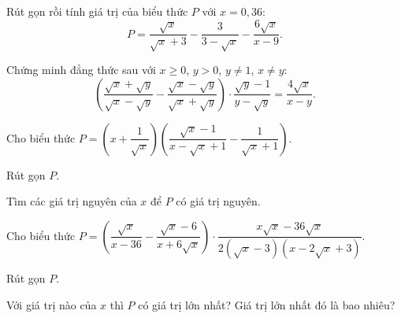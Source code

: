 \begin{bt}%
	Rút gọn rồi tính giá trị của biểu thức $P$ với $x=0{,}36$: 
	$$P =\dfrac{\sqrt{x}}{\sqrt{x} + 3} - \dfrac{3}{3 - \sqrt{x}} - \dfrac{6\sqrt{x}}{x - 9}.$$
\end{bt}
\begin{bt}%
	Chứng minh đẳng thức sau với $x\geq 0$, $y>0$, $y\neq 1$, $x\neq y$:
	$$\left(\dfrac{\sqrt{x} + \sqrt{y}}{\sqrt{x} - \sqrt{y}} - \dfrac{\sqrt{x} - \sqrt{y}}{\sqrt{x} + \sqrt{y}}\right)\cdot\dfrac{\sqrt{y} - 1}{y - \sqrt{y}}=\dfrac{4\sqrt{x}}{x - y}.$$
\end{bt}
\begin{bt}%
	Cho biểu thức $P =\left(x + \dfrac{1}{\sqrt{x}}\right)\left(\dfrac{\sqrt{x} - 1}{x - \sqrt{x} + 1} - \dfrac{1}{\sqrt{x} + 1}\right)$.
	\begin{listEX}
	\item Rút gọn $P$.
	\item Tìm các giá trị nguyên của $x$ để $P$ có giá trị nguyên.
	\end{listEX}	
\end{bt}
\begin{bt}%
	Cho biểu thức $P =\left(\dfrac{\sqrt{x}}{x - 36} - \dfrac{\sqrt{x} - 6}{x + 6\sqrt{x}}\right)\cdot\dfrac{x\sqrt{x} - 36\sqrt{x}}{2\left(\sqrt{x} - 3\right)\left(x - 2\sqrt{x} + 3\right)}$.	
	\begin{listEX}
	\item Rút gọn $P$.
	\item Với giá trị nào của $x$ thì $P$ có giá trị lớn nhất? Giá trị lớn nhất đó là bao nhiêu?
	\end{listEX}	
\end{bt}
